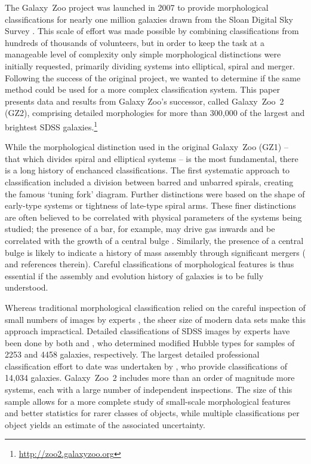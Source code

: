 \documentclass[useAMS,usenatbib]{mn2e}
\begin{document}
The Galaxy~Zoo project \citep{lin08} was launched in 2007 to provide morphological classifications for nearly one million galaxies drawn from the Sloan Digital Sky Survey \citep[SDSS;][]{yor00}. This scale of effort was made possible by combining classifications from hundreds of thousands of volunteers, but in order to keep the task at a manageable level of complexity only simple morphological distinctions were initially requested, primarily dividing systems into elliptical, spiral and merger. Following the success of the original project, we wanted to determine if the same method could be used for a more complex classification system. This paper presents data and results from Galaxy Zoo's successor, called Galaxy~Zoo~2 (GZ2), comprising detailed morphologies for more than 300,000 of the largest and brightest SDSS galaxies.\footnote{\url{http://zoo2.galaxyzoo.org}}

While the morphological distinction used in the original Galaxy~Zoo (GZ1) -- that which divides spiral and elliptical systems -- is the most fundamental, there is a long history of enchanced classifications. The first systematic approach to classification \citep{hub36} included a division between barred and unbarred spirals, creating the famous `tuning fork' diagram. Further distinctions were based on the shape of early-type systems or tightness of late-type spiral arms. These finer distinctions are often believed to be correlated with physical parameters of the systems being studied; the presence of a bar, for example, may drive gas inwards and be correlated with the growth of a central bulge \citep[reviews are given in \citealt{kor04} and][]{mas11c}. Similarly, the presence of a central bulge is likely to indicate a history of mass assembly through significant mergers (\citealt{mar12} and references therein). Careful classifications of morphological features is thus essential if the assembly and evolution history of galaxies is to be fully understood.

Whereas traditional morphological classification relied on the careful inspection of small numbers of images by experts \citep[e.g., ][]{san61,dev91}, the sheer size of modern data sets make this approach impractical. Detailed classifications of SDSS images by experts have been done by both \citet{fuk07} and \citet{bai11}, who determined modified Hubble types for samples of 2253 and 4458 galaxies, respectively. The largest detailed professional classification effort to date was undertaken by \citet{nai10}, who provide classifications of 14,034 galaxies. Galaxy~Zoo~2 includes more than an order of magnitude more systems, each with a large number of independent inspections. The size of this sample allows for a more complete study of small-scale morphological features and better statistics for rarer classes of objects, while multiple classifications per object yields an estimate of the associated uncertainty. 
\end{document}
